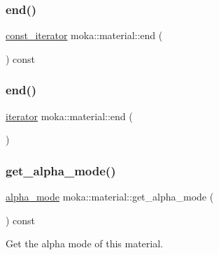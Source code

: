 \mbox{\label{classmoka_1_1material_aa8f02d714d51e11b0336f5a2080090b3}} 
\subsubsection{\texorpdfstring{end()}{end()}\hspace{0.1cm}{\footnotesize\ttfamily [1/2]}}
{\footnotesize\ttfamily \mbox{\hyperlink{classmoka_1_1material_ab87ba893c5a7741e95718b0bddbc1049}{const\+\_\+iterator}} moka\+::material\+::end (\begin{DoxyParamCaption}{ }\end{DoxyParamCaption}) const}

\mbox{\label{classmoka_1_1material_a3538c3832514f230975113c02ef9b019}} 
\subsubsection{\texorpdfstring{end()}{end()}\hspace{0.1cm}{\footnotesize\ttfamily [2/2]}}
{\footnotesize\ttfamily \mbox{\hyperlink{classmoka_1_1material_ac6839c8e1a338dbaef539569388f89e5}{iterator}} moka\+::material\+::end (\begin{DoxyParamCaption}{ }\end{DoxyParamCaption})}

\mbox{\label{classmoka_1_1material_a4e107e847f5ce6877c22a5786ecdd6ca}} 
\subsubsection{\texorpdfstring{get\_alpha\_mode()}{get\_alpha\_mode()}}
{\footnotesize\ttfamily \mbox{\hyperlink{namespacemoka_ad3e7f1428e786c2e7780186b8c0b0d81}{alpha\+\_\+mode}} moka\+::material\+::get\+\_\+alpha\+\_\+mode (\begin{DoxyParamCaption}{ }\end{DoxyParamCaption}) const}



Get the alpha mode of this material. 

